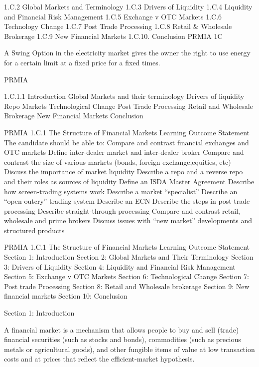 
1.C.2 Global Markets and Terminology
1.C.3 Drivers of Liquidity
1.C.4 Liquidity and Financial Risk Management
1.C.5 Exchange v OTC Markets
1.C.6 Technology Change
1.C.7 Post Trade Processing
1.C.8 Retail \& Wholesale Brokerage
1.C.9 New Financial Markets
1.C.10. Conclusion
PRMIA 1C

A Swing Option in the electricity market gives the owner the right to use energy for a certain limit at a fixed price for a fixed times.



PRMIA

1.C.1.1 Introduction 
Global Markets and their terminology
Drivers of liquidity
Repo Markets
Technological Change
Post Trade Processing
Retail and Wholesale Brokerage
New Financial Markets
Conclusion

PRMIA 1.C.1 The Structure of Financial Markets 
Learning Outcome Statement
The candidate should be able to:
  Compare and contrast financial exchanges and OTC markets
  Define inter-dealer market and inter-dealer broker
  Compare and contrast the size of various markets (bonds, foreign exchange,equities, etc)
  Discuss the importance of market liquidity
  Describe a repo and a reverse repo and their roles as sources of liquidity
  Define an ISDA Master Agreement
  Describe how screen-trading systems work
  Describe a market “specialist”
  Describe an “open-outcry” trading system
  Describe an ECN
  Describe the steps in post-trade processing
  Describe straight-through processing
  Compare and contrast retail, wholesale and prime brokers
  Discuss issues with “new market” developments and structured products


PRMIA 1.C.1 The Structure of Financial Markets
Learning Outcome Statement
Section 1: Introduction
Section 2: Global Markets and Their Terminology
Section 3: Drivers of Liquidity
Section 4: Liquidity and Financial Risk Management
Section 5: Exchange v OTC Markets
Section 6: Technological Change
Section 7: Post trade Processing
Section 8: Retail and Wholesale brokerage
Section 9: New financial markets
Section 10: Conclusion

Section 1: Introduction

A financial market is a mechanism that allows people to buy and sell (trade) financial securities (such as stocks and bonds), commodities (such as precious metals or agricultural goods), and other fungible items of value at low transaction costs and at prices that reflect the efficient-market hypothesis.

